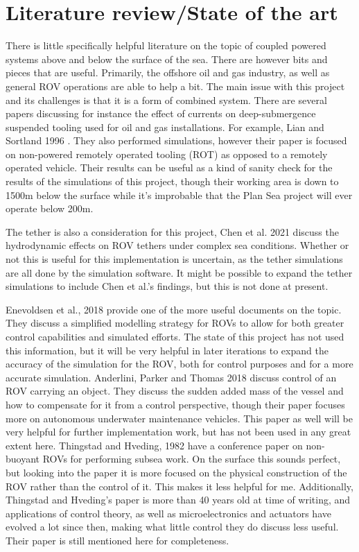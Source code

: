 \section{Literature review/State of the art}
There is little specifically helpful literature on the topic of coupled powered systems above and below the surface of the sea. There are however bits and pieces that are useful. Primarily, the offshore oil and gas industry, as well as general ROV operations are able to help a bit. The main issue with this project and its challenges is that it is a form of combined system. There are several papers discussing for instance the effect of currents on deep-submergence suspended tooling used for oil and gas installations. For example, Lian and Sortland 1996 \cite{lian_manoeuvering_1996}. They also performed simulations, however their paper is focused on non-powered remotely operated tooling (ROT) as opposed to a remotely operated vehicle. Their results can be useful as a kind of sanity check for the results of the simulations of this project, though their working area is down to 1500m below the surface while it's improbable that the Plan Sea project will ever operate below 200m. 

The tether is also a consideration for this project, Chen et al. 2021 \cite{chen_dynamic_2021} discuss the hydrodynamic effects on ROV tethers under complex sea conditions. Whether or not this is useful for this implementation is uncertain, as the tether simulations are all done by the simulation software. It might be possible to expand the tether simulations to include Chen et al.'s findings, but this is not done at present. 

Enevoldsen et al., 2018 \cite{enevoldsen_simplified_2018} provide one of the more useful documents on the topic. They discuss a simplified modelling strategy for ROVs to allow for both greater control capabilities and simulated efforts. The state of this project has not used this information, but it will be very helpful in later iterations to expand the accuracy of the simulation for the ROV, both for control purposes and for a more accurate simulation. Anderlini, Parker and Thomas 2018 \cite{anderlini_control_2018} discuss control of an ROV carrying an object. They discuss the sudden added mass of the vessel and how to compensate for it from a control perspective, though their paper focuses more on autonomous underwater maintenance vehicles. This paper as well will be very helpful for further implementation work, but has not been used in any great extent here. Thingstad and Hveding, 1982 \cite{thingstad_nonbuoyant_1982} have a conference paper on non-buoyant ROVs for performing subsea work. On the surface this sounds perfect, but looking into the paper it is more focused on the physical construction of the ROV rather than the control of it. This makes it less helpful for me. Additionally, Thingstad and Hveding's paper is more than 40 years old at time of writing, and applications of control theory, as well as microelectronics and actuators have evolved a lot since then, making what little control they do discuss less useful. Their paper is still mentioned here for completeness.

